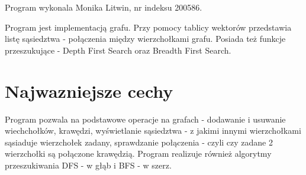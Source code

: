 \-Program wykonala \-Monika \-Litwin, nr indeksu 200586.

\-Program jest implementacją grafu. \-Przy pomocy tablicy wektorów przedstawia listę sąsiedztwa -\/ połączenia między wierzchołkami grafu. \-Posiada też funkcje przeszukujące -\/ \-Depth \-First \-Search oraz \-Breadth \-First \-Search.\section{\-Najwazniejsze cechy}\label{index_etykieta-Wazne-cechy}
\-Program pozwala na podstawowe operacje na grafach -\/ dodawanie i usuwanie wiechchołków, krawędzi, wyświetlanie sąsiedztwa -\/ z jakimi innymi wierzchołkami sąsiaduje wierzchołek zadany, sprawdzanie połączenia -\/ czyli czy zadane 2 wierzchołki są połączone krawędzią. \-Program realizuje również algorytmy przeszukiwania \-D\-F\-S -\/ w głąb i \-B\-F\-S -\/ w szerz. 